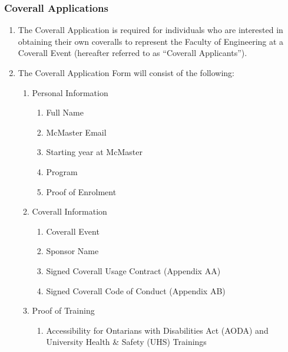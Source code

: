 \subsubsection{Coverall Applications}
\label{coverall-applications}
\begin{enumerate}
 \item
  The Coverall Application is required for individuals who are
  interested in obtaining their own coveralls to represent the Faculty
  of Engineering at a Coverall Event (hereafter referred to as
  ``Coverall Applicants'').
 \item
  The Coverall Application Form will consist of the following:

  \begin{enumerate}
   \item
    Personal Information

    \begin{enumerate}
     \item
      Full Name
     \item
      McMaster Email
     \item
      Starting year at McMaster
     \item
      Program
     \item
      Proof of Enrolment
    \end{enumerate}
   \item
    Coverall Information

    \begin{enumerate}
     \item
      Coverall Event
     \item
      Sponsor Name
     \item
      Signed Coverall Usage Contract (Appendix AA)
     \item
      Signed Coverall Code of Conduct (Appendix AB)
    \end{enumerate}
   \item
    Proof of Training

    \begin{enumerate}
     \item
      Accessibility for Ontarians with Disabilities Act (AODA) and
      University Health \& Safety (UHS) Trainings


\end{enumerate}
\end{enumerate}
\end{enumerate}

